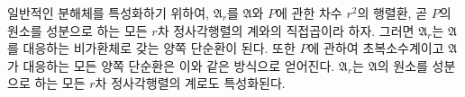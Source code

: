 \documentclass[11pt]{article}
\providecommand{\mA}{\mathfrak{A}}
\begin{document}
일반적인 분해체를 특성화하기 위하여, $\mA_r$를 $\mA$와 $P$에 관한 차수 $r^2$의 행렬환, 곧 $P$의 원소를 성분으로 하는 모든 $r$차 정사각행렬의 계와의 직접곱이라 하자. 그러면 $\mA_r$는 $\mA$를 대응하는 비가환체로 갖는 양쪽 단순환이 된다. 또한 $P$에 관하여 초복소수계이고 $\mA$가 대응하는 모든 양쪽 단순환은 이와 같은 방식으로 얻어진다. $\mA_r$는 $\mA$의 원소를 성분으로 하는 모든 $r$차 정사각행렬의 계로도 특성화된다.
\end{document}
